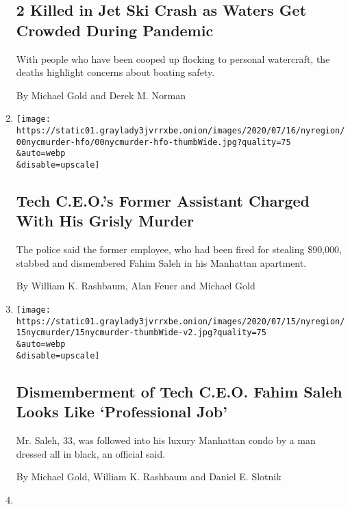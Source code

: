 \begin{enumerate}
{  \subsection{2 Killed in Jet Ski Crash as Waters Get Crowded During
  Pandemic}\label{2-killed-in-jet-ski-crash-as-waters-get-crowded-during-pandemic}}

  With people who have been cooped up flocking to personal watercraft,
  the deaths highlight concerns about boating safety.

  By Michael Gold and Derek M. Norman
\item
  \href{/2020/07/17/nyregion/fahim-saleh-suspect-tyrese-devon-haspil.html}{}

  \texttt{[image: https://static01.graylady3jvrrxbe.onion/images/2020/07/16/nyregion/00nycmurder-hfo/00nycmurder-hfo-thumbWide.jpg?quality=75\\\&auto=webp\\\&disable=upscale]}

  \hypertarget{tech-ceos-former-assistant-charged-with-his-grisly-murder}{%
  \subsection{Tech C.E.O.'s Former Assistant Charged With His Grisly
  Murder}\label{tech-ceos-former-assistant-charged-with-his-grisly-murder}}

  The police said the former employee, who had been fired for stealing
  \$90,000, stabbed and dismembered Fahim Saleh in his Manhattan
  apartment.

  By William K. Rashbaum, Alan Feuer and Michael Gold
\item
  \href{/2020/07/15/nyregion/fahim-saleh-lower-east-side-murder.html}{}

  \texttt{[image: https://static01.graylady3jvrrxbe.onion/images/2020/07/15/nyregion/15nycmurder/15nycmurder-thumbWide-v2.jpg?quality=75\\\&auto=webp\\\&disable=upscale]}

  \hypertarget{dismemberment-of-tech-ceo-fahim-saleh-looks-like-professional-job}{%
  \subsection{Dismemberment of Tech C.E.O. Fahim Saleh Looks Like
  `Professional
  Job'}\label{dismemberment-of-tech-ceo-fahim-saleh-looks-like-professional-job}}

  Mr. Saleh, 33, was followed into his luxury Manhattan condo by a man
  dressed all in black, an official said.

  By Michael Gold, William K. Rashbaum and Daniel E. Slotnik
\item
  \href{/2020/07/13/nyregion/Davell-Gardner-brooklyn-shooting.html}{}


\end{enumerate}
